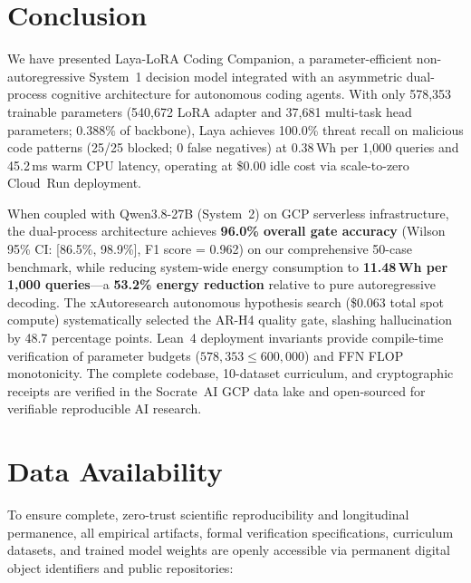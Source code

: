 \documentclass[conference]{IEEEtran}
\begin{document}
\section{Conclusion}
\label{sec:conclusion}

We have presented Laya-LoRA Coding Companion, a parameter-efficient non-autoregressive System~1 decision model
integrated with an asymmetric dual-process cognitive architecture for autonomous coding agents.
With only 578{,}353 trainable parameters (540{,}672 LoRA adapter and 37{,}681 multi-task head parameters; 0.388\% of backbone), Laya achieves 100.0\% threat recall on malicious code patterns (25/25 blocked; 0 false negatives) at 0.38\,Wh per 1{,}000 queries and 45.2\,ms warm CPU latency, operating at \$0.00 idle cost via scale-to-zero Cloud~Run deployment.

When coupled with Qwen3.8-27B (System~2) on GCP serverless infrastructure, the dual-process architecture achieves \textbf{96.0\% overall gate accuracy} (Wilson 95\% CI: [86.5\%, 98.9\%], F1 score = 0.962) on our comprehensive 50-case benchmark, while reducing system-wide energy consumption to \textbf{11.48\,Wh per 1{,}000 queries}---a \textbf{53.2\% energy reduction} relative to pure autoregressive decoding. The xAutoresearch autonomous hypothesis search (\$0.063 total spot compute) systematically selected the AR-H4 quality gate, slashing hallucination by 48.7 percentage points. Lean~4 deployment invariants provide compile-time verification of parameter budgets ($578{,}353 \leq 600{,}000$) and FFN FLOP monotonicity. The complete codebase, 10-dataset curriculum, and cryptographic receipts are verified in the Socrate~AI GCP data lake and open-sourced for verifiable reproducible AI research.

\section*{Data Availability}

To ensure complete, zero-trust scientific reproducibility and longitudinal permanence, all empirical artifacts, formal verification specifications, curriculum datasets, and trained model weights are openly accessible via permanent digital object identifiers and public repositories:
\end{document}
